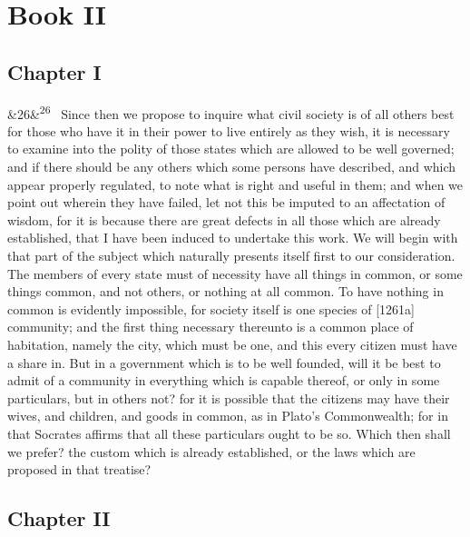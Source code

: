 \documentclass[12pt]{article}
\newcommand{\para}[1][]{\par\noindent\ifx&#1&\else\textsuperscript{\footnotesize #1}~\fi}
\begin{document}
\section*{Book II}

\subsection*{Chapter I}

\para[26] Since then we propose to inquire what civil society is of all others best for those who have it in their power to live entirely as they wish, it is necessary to examine into the polity of those states which are allowed to be well governed; and if there should be any others which some persons have described, and which appear properly regulated, to note what is right and useful in them; and when we point out wherein they have failed, let not this be imputed to an affectation of wisdom, for it is because there are great defects in all those which are already established, that I have been induced to undertake this work. We will begin with that part of the subject which naturally presents itself first to our consideration. The members of every state must of necessity have all things in common, or some things common, and not others, or nothing at all common. To have nothing in common is evidently impossible, for society itself is one species of [1261a] community; and the first thing necessary thereunto is a common place of habitation, namely the city, which must be one, and this every citizen must have a share in. But in a government which is to be well founded, will it be best to admit of a community in everything which is capable thereof, or only in some particulars, but in others not? for it is possible that the citizens may have their wives, and children, and goods in common, as in Plato's Commonwealth; for in that Socrates affirms that all these particulars ought to be so. Which then shall we prefer? the custom which is already established, or the laws which are proposed in that treatise?

\subsection*{Chapter II}
\end{document}
